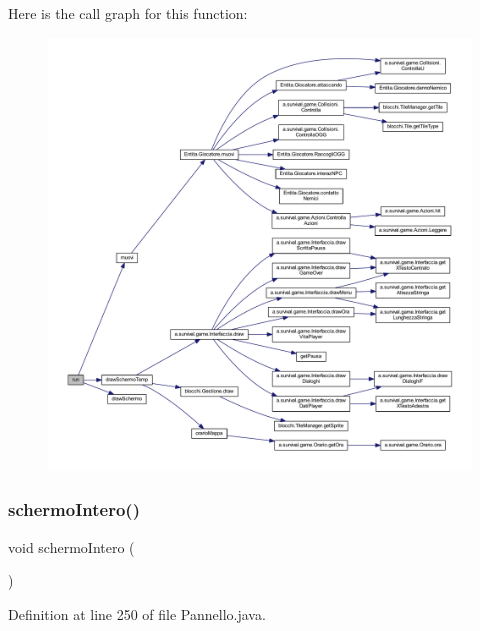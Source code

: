 Here is the call graph for this function\+:
\nopagebreak
\begin{figure}[H]
\begin{center}
\leavevmode
\includegraphics[width=350pt]{classa_1_1survival_1_1game_1_1_pannello_a13a43e6d814de94978c515cb084873b1_cgraph}
\end{center}
\end{figure}
\mbox{\label{classa_1_1survival_1_1game_1_1_pannello_afcdfb03d382a1f735d929602329d276b}} 
\subsubsection{\texorpdfstring{schermo\+Intero()}{schermoIntero()}}
{\footnotesize\ttfamily void schermo\+Intero (\begin{DoxyParamCaption}{ }\end{DoxyParamCaption})}



Definition at line 250 of file Pannello.\+java.

